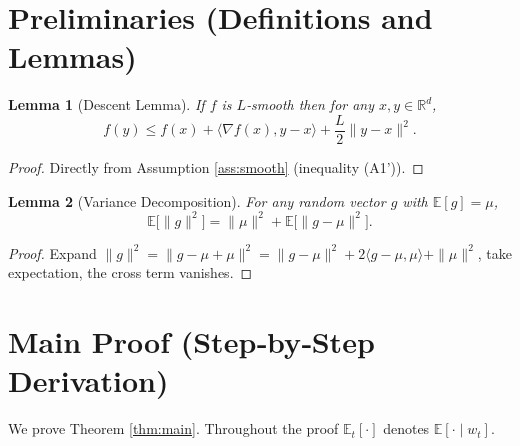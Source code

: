\documentclass{article}
\newtheorem{lemma}{Lemma}
\begin{document}
\newpage
\section*{Preliminaries (Definitions and Lemmas)}
\begin{lemma}[Descent Lemma]\label{lem:descent}
If $f$ is $L$‑smooth then for any $x,y\in\mathbb{R}^{d}$,
\[
f(y)\le f(x)+\langle\nabla f(x),y-x\rangle+\frac{L}{2}\|y-x\|^{2}.
\]
\end{lemma}
\begin{proof}
Directly from Assumption \ref{ass:smooth} (inequality (A1')). \hfill\qedsymbol
\end{proof}

\begin{lemma}[Variance Decomposition]\label{lem:var}
For any random vector $g$ with $\mathbb{E}[g]=\mu$,
\[
\mathbb{E}\bigl[\|g\|^{2}\bigr]=\|\mu\|^{2}+\mathbb{E}\bigl[\|g-\mu\|^{2}\bigr].
\]
\end{lemma}
\begin{proof}
Expand $\|g\|^{2}=\|g-\mu+\mu\|^{2}=\|g-\mu\|^{2}+2\langle g-\mu,\mu\rangle+\|\mu\|^{2}$,
take expectation, the cross term vanishes. \hfill\qedsymbol
\end{proof}

\section*{Main Proof (Step‑by‑Step Derivation)}
We prove Theorem \ref{thm:main}.  Throughout the proof $\mathbb{E}_{t}[\cdot]$
denotes $\mathbb{E}[\cdot\mid w_{t}]$.
\end{document}
